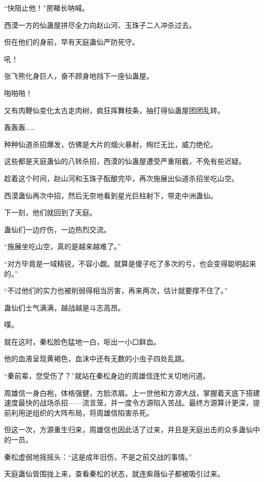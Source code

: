 
\begin{this_body}

“快阻止他！”房睇长呐喊。

西漠一方的仙蛊屋拼尽全力向赵山河、玉珠子二人冲杀过去。

但在他们的身前，早有天庭蛊仙严防死守。

吼！

张飞熊化身巨人，奋不顾身地挡下一座仙蛊屋。

啪啪啪！

又有肉鞭仙变化太古走肉树，疯狂挥舞枝条，抽打得仙蛊屋团团乱转。

轰轰轰……

种种仙道杀招爆发，仿佛是大片的烟火暴射，绚烂无比，威力绝伦。

这些都是天庭蛊仙的八转杀招，西漠的仙蛊屋遭受严重阻截，不免有些迟疑。

趁着这个时间，赵山河和玉珠子酝酿完毕，再次施展出仙道杀招坐吃山空。

西漠蛊仙再次中招，然后无奈地看到星光巨柱射下，带走中洲蛊仙。

下一刻，他们就回到了天庭。

蛊仙们一边疗伤，一边热烈交流。

“施展坐吃山空，真的是越来越难了。”

“对方毕竟是一域精锐，不容小觑。就算是傻子吃了多次的亏，也会变得聪明起来的。”

“不过他们的实力也被削弱得相当厉害，再来两次，估计就要撑不住了。”

蛊仙们士气满满，越战越是斗志高昂。

噗。

就在这时，秦松脸色猛地一白，呕出一小口鲜血。

他的血液呈现黄褐色，血沫中还有无数的小虫子四处乱跳。

“秦前辈，您受伤了？”就站在秦松身边的周雄信连忙关切地问道。

周雄信一身白袍，体格强健，方脸浓眉。上一世他和方源大战，掌握着天底下搭建速度最快的战场杀招——流言笼，并一度令方源陷入苦战。最终方源算计更深，提前利用逆组织的大阵布局，将周雄信陷害杀死。

但这一次，方源重生归来，周雄信也因此活了过来，并且是天庭出击的众多蛊仙中的一员。

秦松虚弱地摇摇头：“这是成年旧伤，不是之前交战的事情。”

天庭蛊仙皆围拢上来，查看秦松的状态，就连紫薇仙子都被吸引过来。


\end{this_body}
